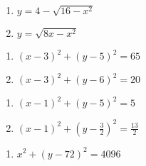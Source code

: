 \documentclass{ximera}
\begin{document}
\begin{multicols}{2}
\begin{enumerate}
\setcounter{enumi}{\value{HW}}

\item  $y = 4-\sqrt{16-x^2}$

\item $y = \sqrt{8x-x^2}$

\setcounter{HW}{\value{enumi}}
\end{enumerate}
\end{multicols}




\begin{multicols}{2}
\begin{enumerate}
\setcounter{enumi}{\value{HW}}

\item $(x - 3)^{2} + (y - 5)^{2} = 65$

\item  $(x-3)^2+(y-6)^2 = 20$

\setcounter{HW}{\value{enumi}}
\end{enumerate}
\end{multicols}

\begin{multicols}{2}
\begin{enumerate}
\setcounter{enumi}{\value{HW}}

\item  $(x-1)^2 + (y-5)^2 = 5$

\item $(x-1)^2 + \left(y - \frac{3}{2}\right)^2 = \frac{13}{2}$

\setcounter{HW}{\value{enumi}}
\end{enumerate}
\end{multicols}

\begin{enumerate}
\setcounter{enumi}{\value{HW}}

\item $x^{2} + (y - 72)^{2} = 4096$

\end{enumerate}
\end{document}
